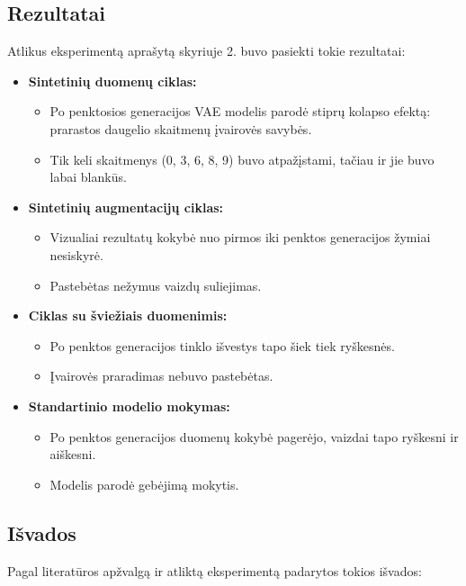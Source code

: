 \documentclass{VUMIFInfKursinis}
\begin{document}
\subsection{Rezultatai}
Atlikus eksperimentą aprašytą skyriuje 2. buvo pasiekti tokie rezultatai:
\begin{itemize}
    \item \textbf{Sintetinių duomenų ciklas:}
    \begin{itemize}
        \item Po penktosios generacijos VAE modelis parodė stiprų kolapso efektą: prarastos daugelio skaitmenų įvairovės savybės.
        \item Tik keli skaitmenys (0, 3, 6, 8, 9) buvo atpažįstami, tačiau ir jie buvo labai blankūs.
    \end{itemize}
    \item \textbf{Sintetinių augmentacijų ciklas:}
    \begin{itemize}
        \item Vizualiai rezultatų kokybė nuo pirmos iki penktos generacijos žymiai nesiskyrė.
        \item Pastebėtas nežymus vaizdų suliejimas.
    \end{itemize}
    \item \textbf{Ciklas su šviežiais duomenimis:}
    \begin{itemize}
        \item Po penktos generacijos tinklo išvestys tapo šiek tiek ryškesnės.
        \item Įvairovės praradimas nebuvo pastebėtas.
    \end{itemize}
    \item \textbf{Standartinio modelio mokymas:}
    \begin{itemize}
        \item Po penktos generacijos duomenų kokybė pagerėjo, vaizdai tapo ryškesni ir aiškesni.
        \item Modelis parodė gebėjimą mokytis.
    \end{itemize}
\end{itemize}

\subsection{Išvados}
Pagal literatūros apžvalgą ir atliktą eksperimentą padarytos tokios išvados:
\end{document}
